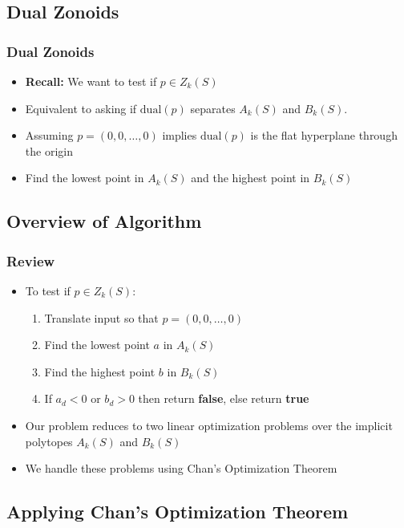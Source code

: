 \documentclass{beamer}
\begin{document}
\subsection{Dual Zonoids}
\frame
{
   \frametitle{Dual Zonoids}
   \begin{itemize}
     \item<1-> \textbf{Recall:} We want to test if $p\in Z_k(S)$
      \begin{center}
      \end{center}
     \item<2-> Equivalent to asking if $\mathrm{dual}(p)$ separates 
	$A_k(S)$ and $B_k(S)$.
     \item<3-> Assuming $p=(0,0,\ldots,0)$ implies $\mathrm{dual}(p)$ 
	is the flat hyperplane through the origin
     \item<4-> Find the lowest point in $A_k(S)$ and the highest point
	in $B_k(S)$ 
   \end{itemize}
}

\subsection{Overview of Algorithm}
\frame
{
     \frametitle{Review}
     \begin{itemize}
     \item<1-> To test if $p\in Z_k(S)$:
     \begin{enumerate}
      \item<2-> Translate input so that $p=(0,0,\ldots,0)$
      \item<3-> Find the lowest point $a$ in $A_k(S)$
      \item<4-> Find the highest point $b$ in $B_k(S)$
      \item<5-> If $a_d < 0$ or $b_d >0$
	then return \textbf{false}, else return \textbf{true}
     \end{enumerate}
     \item<6->Our problem reduces to two linear optimization problems over
	the implicit polytopes $A_k(S)$ and $B_k(S)$ 
     \item<7->We handle these problems using Chan's Optimization Theorem
    \end{itemize} 
}

\subsection{Applying Chan's Optimization Theorem}
\end{document}
